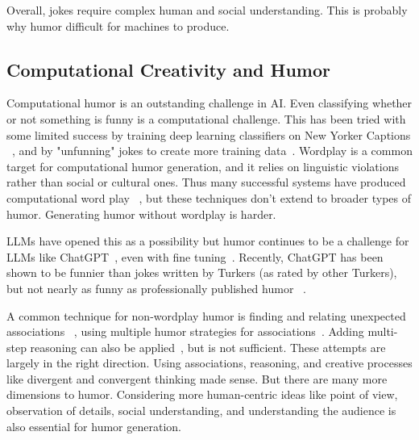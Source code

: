 Overall, jokes require complex human and social understanding. This is probably why humor difficult for machines to produce.




\subsection{Computational Creativity and Humor}


Computational humor is an outstanding challenge in AI. Even
classifying whether or not something is funny is a computational challenge. This has been tried with some limited success by training deep learning classifiers on New Yorker Captions ~\cite{shahafjokes}, and by "unfunning" jokes to create more training data~\cite{unfun}.
Wordplay is a common target for computational humor generation, and it relies on linguistic violations rather than social or cultural ones. Thus many successful systems have produced computational word play ~\cite{jape, twss, witscript1, he2019pungenerationsurprise, Taylor04computationallyrecognizing}, but these techniques don't extend to broader types of humor. 
Generating humor without wordplay is harder. 

LLMs have opened this as a possibility but humor continues to be a challenge for LLMs like ChatGPT~\cite{gptnotfunny, deepmind_humor}, even with fine tuning~\cite{anonymous2024funlms}. 
Recently, ChatGPT has been shown to be funnier than jokes written by Turkers (as rated by other Turkers), but not nearly as funny as professionally published humor ~\cite{gptvsturk}.

A common technique for non-wordplay humor is finding and relating unexpected associations ~\cite{witscript2}, using multiple humor strategies for associations~\cite{witscript3}.
Adding multi-step reasoning can also be applied~\cite{tikhonov2024humormechanicsadvancinghumor}, but is not sufficient. 
These attempts are largely in the right direction. Using associations, reasoning, and creative processes like divergent and convergent thinking made sense. But there are many more dimensions to humor. Considering more human-centric ideas like point of view, observation of details, social understanding, and understanding the audience is also essential for humor generation. 

